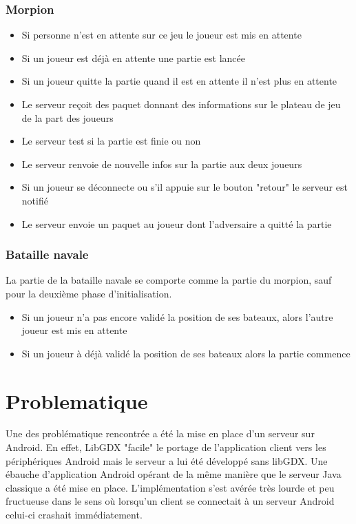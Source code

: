 \documentclass{report}
\begin{document}
\subsection{Morpion}
\begin{itemize}
  \item Si personne n'est en attente sur ce jeu le joueur est mis en attente
  \item Si un joueur est déjà en attente une partie est lancée
  \item Si un joueur quitte la partie quand il est en attente il n'est plus en attente
  \item Le serveur reçoit des paquet donnant des informations sur le plateau de jeu de la part des joueurs
  \item Le serveur test si la partie est finie ou non
  \item Le serveur renvoie de nouvelle infos sur la partie aux deux joueurs
  \item Si un joueur se déconnecte ou s'il appuie sur le bouton "retour" le serveur est notifié
  \item Le serveur envoie un paquet au joueur dont l'adversaire a quitté la partie
\end{itemize}

\subsection{Bataille navale}
La partie de la bataille navale se comporte comme la partie du morpion, sauf pour la deuxième phase d'initialisation.
\begin{itemize}
  \item Si un joueur n'a pas encore validé la position de ses bateaux, alors l'autre joueur est mis en attente
  \item Si un joueur à déjà validé la position de ses bateaux alors la partie commence
\end{itemize}

\chapter{Problematique}
Une des problématique rencontrée a été la mise en place d'un serveur sur Android. En effet, LibGDX "facile" le portage de l'application client vers les
périphériques Android mais le serveur a lui été développé sans libGDX. Une ébauche d'application Android opérant de la même manière que le serveur Java classique a
été mise en place. L'implémentation s'est avérée très lourde et peu fructueuse dans le sens où lorsqu'un client se connectait à un serveur Android celui-ci crashait
immédiatement.
\end{document}
